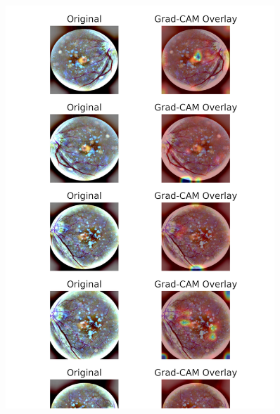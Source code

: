 \documentclass[a4paper,12pt]{report}
\begin{document}
\begin{figure}[h!]
    \centering
    \includegraphics[width=0.9\textwidth]{up.png}
\end{figure}

\clearpage
\end{document}
